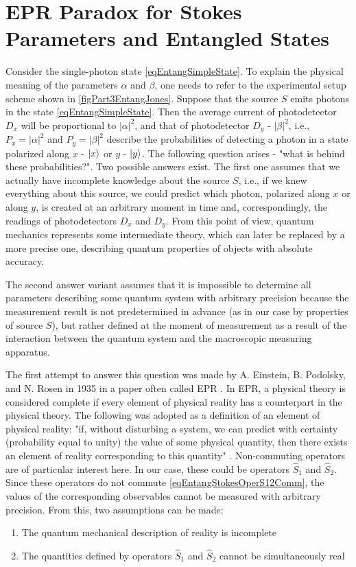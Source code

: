 \section{EPR Paradox for Stokes Parameters and Entangled States}
\label{sec:part3:epr}
Consider the single-photon state \eqref{eqEntangSimpleState}. 
To explain
the physical meaning of the parameters $\alpha$ and $\beta$, one needs to refer to the experimental setup scheme shown in
\autoref{figPart3EntangJones}. Suppose that the source $S$ emits
photons in the state \eqref{eqEntangSimpleState}. Then the average current
of photodetector $D_x$ will be proportional to
$\left|\alpha\right|^2$, and that of photodetector $D_y$ -
$\left|\beta\right|^2$, i.e., $P_x = \left|\alpha\right|^2$ and $P_y =
\left|\beta\right|^2$ describe the probabilities of detecting a photon in
a state polarized along $x$ - $\ket{x}$ or $y$ -
$\ket{y}$. The following question arises - "what is behind these
probabilities?". Two possible answers exist. The first one
assumes that we actually have incomplete knowledge about the source $S$,
i.e., if we knew everything about this source, we could
predict which photon, polarized along $x$ or along $y$, is created at
an arbitrary moment in time and, correspondingly, the readings of
photodetectors $D_x$ and $D_y$. From this point of view,
quantum mechanics represents some intermediate
theory, which can later be replaced by a more precise one,
describing quantum properties of objects with absolute accuracy. 

The second answer variant assumes that it is impossible to determine
all parameters describing some quantum system with arbitrary
precision because the measurement result is not predetermined in advance (as
in our case by properties of source $S$), but rather defined at the moment
of measurement as a result of the interaction between the quantum system and
the macroscopic measuring apparatus. 

The first attempt to answer this question was made by 
A. Einstein, B. Podolsky, and N. Rosen in 1935 in a paper often called EPR \cite{bEPR}.  
In EPR, a physical theory is considered
complete if every element of physical reality has a counterpart in
the physical theory. The following was adopted as a definition of an element of physical
reality: "if, without disturbing a system, we can predict with certainty (probability equal to unity) the value of some physical quantity, then there exists an element of reality corresponding to this
quantity" \cite{bBelokTimHrus}. Non-commuting operators are of particular interest here. In our case, these could be operators
$\hat{S}_1$ and $\hat{S}_2$. Since these operators do not commute
\eqref{eqEntangStokesOperS12Comm}, the values of the corresponding observables cannot be measured with arbitrary
precision. From this, two assumptions can be made:
\begin{enumerate}
\item The quantum mechanical description of reality is incomplete
\item The quantities defined by operators $\hat{S}_1$ and $\hat{S}_2$ cannot be simultaneously real
\end{enumerate}

